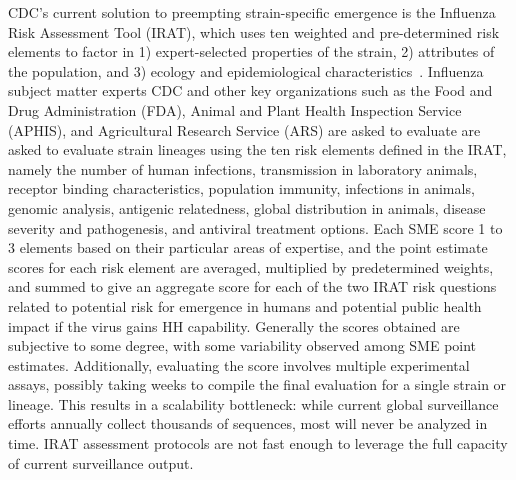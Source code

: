 \documentclass[onecolumn, compsoc,10pt]{IEEEtran}
\begin{document}
CDC's current solution to preempting strain-specific emergence  is the Influenza Risk Assessment Tool (IRAT), which  uses  ten weighted and pre-determined risk elements to factor in   1) expert-selected properties of the strain, 2) attributes of the population, and 3) ecology and epidemiological characteristics~\cite{Influenz24:online}. Influenza subject matter experts CDC and other key organizations such as the Food and Drug Administration (FDA), Animal and Plant Health Inspection Service (APHIS), and Agricultural Research Service (ARS) are asked to evaluate are asked to evaluate strain lineages using the ten risk elements defined in the IRAT, namely the number of human infections, transmission in laboratory animals, receptor binding characteristics, population immunity, infections in animals, genomic analysis, antigenic relatedness, global distribution in animals, disease severity and  pathogenesis, and antiviral treatment options. Each SME score 1 to 3 elements based on their
particular areas of expertise, and the point estimate scores for each risk element are averaged, multiplied by predetermined weights, and summed to give an aggregate score for each of the two IRAT risk questions related to potential risk for emergence in humans and potential public health impact if the virus gains HH capability. Generally  the scores obtained are subjective to some degree, with some variability observed among SME point estimates. Additionally, evaluating the score  involves multiple experimental assays, possibly taking  weeks to compile the final  evaluation for a single strain or lineage. This results in  a scalability bottleneck: while  current global surveillance efforts annually  collect  thousands of sequences, most  will never be analyzed in time. IRAT assessment protocols are  not fast enough to leverage the full capacity of current surveillance output.%



\end{document}
